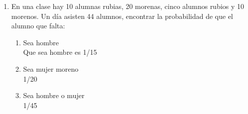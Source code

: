\documentclass[12pt,letterpaper]{report}
\begin{document}
\begin{enumerate}
\begin{enumerate}
    Aqui sera calcular 3/10*3*10
    \item Sin reemplazamiento\\
    En este caso sera 3/10*2/9, ya que las bolas no se regresaron
    \end{enumerate}
    \item En una clase hay 10 alumnas rubias, 20 morenas, cinco alumnos rubios y 10 morenos. Un día asisten 44 alumnos, encontrar la probabilidad de que el alumno que falta:
    \begin{enumerate}
    \item Sea hombre\\
    Que sea hombre es 1/15
    \item Sea mujer moreno\\
    1/20
    \item Sea hombre o mujer\\
    1/45
    \end{enumerate}
\end{enumerate}
\end{document}

